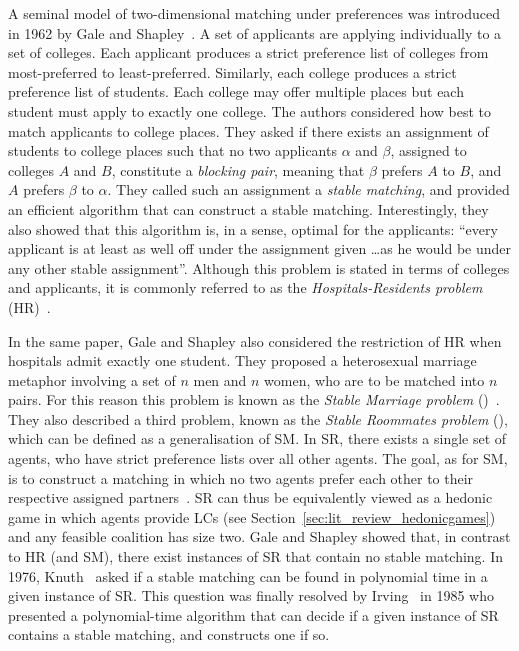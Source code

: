 A seminal model of two-dimensional matching under preferences was introduced in 1962 by Gale and Shapley~\cite{GS62}. A set of applicants are applying individually to a set of colleges. Each applicant produces a strict preference list of colleges from most-preferred to least-preferred. Similarly, each college produces a strict preference list of students. Each college may offer multiple places but each student must apply to exactly one college. The authors considered how best to match applicants to college places. They asked if there exists an assignment of students to college places such that no two applicants $\alpha$ and $\beta$, assigned to colleges $A$ and $B$, constitute a \emph{blocking pair}, meaning that $\beta$ prefers $A$ to $B$, and $A$ prefers $\beta$ to $\alpha$. They called such an assignment a \emph{stable matching}, and provided an efficient algorithm that can construct a stable matching. Interestingly, they also showed that this algorithm is, in a sense, optimal for the applicants: ``every applicant is at least as well off under the assignment given \dots as he would be under any other stable assignment''. Although this problem is stated in terms of colleges and applicants, it is commonly referred to as the \emph{Hospitals-Residents problem} (HR)~\cite{AMUP}.

In the same paper, Gale and Shapley also considered the restriction of HR when hospitals admit exactly one student. They proposed a heterosexual marriage metaphor involving a set of $n$ men and $n$ women, who are to be matched into $n$ pairs. For this reason this problem is known as the \emph{Stable Marriage problem} ()~\cite{AMUP}. They also described a third problem, known as the \emph{Stable Roommates problem} (), which can be defined as a generalisation of SM. In SR, there exists a single set of agents, who have strict preference lists over all other agents. The goal, as for SM, is to construct a matching in which no two agents prefer each other to their respective assigned partners~\cite{Irv85}. SR can thus be equivalently viewed as a hedonic game in which agents provide LCs (see Section~\ref{sec:lit_review_hedonicgames}) and any feasible coalition has size two. Gale and Shapley showed that, in contrast to HR (and SM), there exist instances of SR that contain no stable matching. In 1976, Knuth~\cite[Problem~12]{Knu97english} asked if a stable matching can be found in polynomial time in a given instance of SR. This question was finally resolved by Irving~\cite{Irv85} in 1985 who presented a polynomial-time algorithm that can decide if a given instance of SR contains a stable matching, and constructs one if so.

